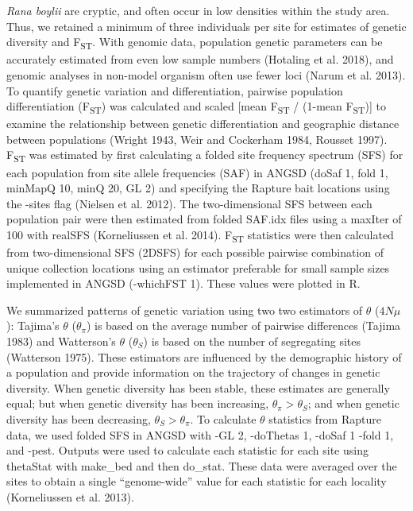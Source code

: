 \documentclass[twoside,12pt,final]{ucthesis-CA2012} %
\begin{document}
\begin{ucmainmatter}
\emph{Rana boylii} are cryptic, and often occur in low densities within
the study area. Thus, we retained a minimum of three individuals per
site for estimates of genetic diversity and F\textsubscript{ST}. With
genomic data, population genetic parameters can be accurately estimated
from even low sample numbers (Hotaling et al. 2018), and genomic
analyses in non-model organism often use fewer loci (Narum et al. 2013).
To quantify genetic variation and differentiation, pairwise population
differentiation (F\textsubscript{ST}) was calculated and scaled {[}mean
F\textsubscript{ST} / (1-mean F\textsubscript{ST}){]} to examine the
relationship between genetic differentiation and geographic distance
between populations (Wright 1943, Weir and Cockerham 1984, Rousset
1997). F\textsubscript{ST} was estimated by first calculating a folded
site frequency spectrum (SFS) for each population from site allele
frequencies (SAF) in ANGSD (doSaf 1, fold 1, minMapQ 10, minQ 20, GL 2)
and specifying the Rapture bait locations using the -sites flag (Nielsen
et al. 2012). The two-dimensional SFS between each population pair were
then estimated from folded SAF.idx files using a maxIter of 100 with
realSFS (Korneliussen et al. 2014). F\textsubscript{ST} statistics were
then calculated from two-dimensional SFS (2DSFS) for each possible
pairwise combination of unique collection locations using an estimator
preferable for small sample sizes implemented in ANGSD (-whichFST 1).
These values were plotted in R.

We summarized patterns of genetic variation using two two estimators of
\(\theta\) (\(4N\mu\)): Tajima's \(\theta\) (\(\theta_\pi\)) is based on
the average number of pairwise differences (Tajima 1983) and Watterson's
\(\theta\) (\(\theta_S\)) is based on the number of segregating sites
(Watterson 1975). These estimators are influenced by the demographic
history of a population and provide information on the trajectory of
changes in genetic diversity. When genetic diversity has been stable,
these estimates are generally equal; but when genetic diversity has been
increasing, \(\theta_\pi > \theta_S\); and when genetic diversity has
been decreasing, \(\theta_S > \theta_\pi\). To calculate \(\theta\)
statistics from Rapture data, we used folded SFS in ANGSD with -GL 2,
-doThetas 1, -doSaf 1 -fold 1, and -pest. Outputs were used to calculate
each statistic for each site using thetaStat with make\_bed and then
do\_stat. These data were averaged over the sites to obtain a single
``genome-wide'' value for each statistic for each locality (Korneliussen
et al. 2013).


\end{ucmainmatter}
\end{document}
